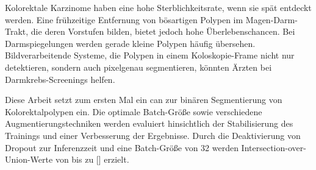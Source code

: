 Kolorektale Karzinome haben eine hohe Sterblichkeitsrate, wenn sie spät entdeckt werden.
Eine frühzeitige Entfernung von bösartigen Polypen im Magen-Darm-Trakt, die deren Vorstufen bilden, bietet jedoch hohe Überlebenschancen.
Bei Darmspiegelungen werden gerade kleine Polypen häufig übersehen.
Bildverarbeitende Systeme, die Polypen in einem Koloskopie-Frame nicht nur detektieren, sondern auch pixelgenau segmentieren, könnten Ärzten bei Darmkrebs-Screenings helfen.

Diese Arbeit setzt zum ersten Mal ein \acrlong{can} zur binären Segmentierung von Kolorektalpolypen ein.
Die optimale Batch-Größe sowie verschiedene Augmentierungstechniken werden evaluiert hinsichtlich der Stabilisierung des Trainings und einer Verbesserung der Ergebnisse.
Durch die Deaktivierung von Dropout zur Inferenzzeit und eine Batch-Größe von 32 werden Intersection-over-Union-Werte von bis zu [] erzielt.
